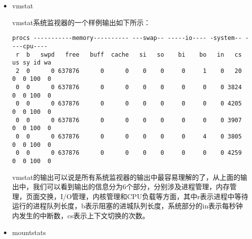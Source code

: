 \begin{itemize}
\item vmstat

vmstat系统监视器的一个样例输出如下所示：
{\footnotesize
\begin{verbatim}
procs -----------memory---------- ---swap-- -----io---- -system-- ----cpu----
 r  b   swpd   free   buff  cache   si   so    bi    bo   in   cs us sy id wa
 2  0      0 637876      0      0    0    0     0     1    0   20  0  0 100  0
 0  0      0 637876      0      0    0    0     0     0    0 3824  0  0 100  0
 0  0      0 637876      0      0    0    0     0     0    0 4205  0  0 100  0
 0  0      0 637876      0      0    0    0     0     0    0 3907  0  0 100  0
 0  0      0 637876      0      0    0    0     0     4    0 3805  0  0 100  0
 0  0      0 637876      0      0    0    0     0     0    0 4259  0  0 100  0
\end{verbatim}
}
vmstat的输出可以说是所有系统监视器的输出中最容易理解的了，从上面的输出中，我们可以看到输出的信息分为6个部分，分别涉及进程管理，内存管理，页面交换，I/O管理，内核管理和CPU负载等方面，其中r表示进程中等待运行的进程队列长度，b表示阻塞的进城队列长度，系统部分的in表示每秒钟内发生的中断数，cs表示上下文切换的次数。

\item mountstats


\end{itemize}
